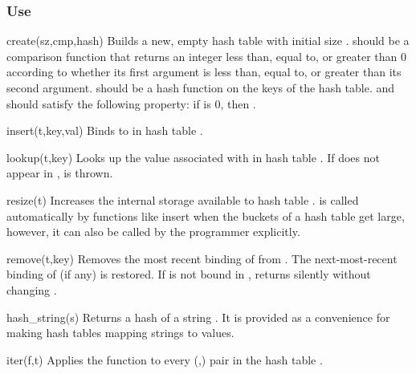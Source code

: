 \subsubsection*{Use}

\begin{defun}{create}{(sz,cmp,hash)}
Builds a new, empty hash table with initial size .  
should be a comparison function that returns an integer less than, equal
to, or greater than 0 according to whether its first argument is less
than, equal to, or greater than its second argument.   should
be a hash function on the keys of the hash table.   and
 should satisfy the following property: if
 is 0, then .
\end{defun}

\begin{defun}{insert}{(t,key,val)}
Binds  to  in hash table .
\end{defun}

\begin{defun}{lookup}{(t,key)}
Looks up the value associated with  in hash table .  If
 does not appear in ,  is thrown.
\end{defun}


\begin{defun}{resize}{(t)}
Increases the internal storage available to hash table .
 is called automatically by functions like insert when the
buckets of a hash table get large, however, it can also be called by the
programmer explicitly.
\end{defun}

\begin{defun}{remove}{(t,key)}
Removes the most recent binding of  from .  The
next-most-recent binding of  (if any) is restored.  If
 is not bound in ,  returns silently
without changing .
\end{defun}


\begin{defun}{hash_string}{(s)}
Returns a hash of a string .  It is provided as a convenience for
making hash tables mapping strings to values.
\end{defun}

\begin{defun}{iter}{(f,t)}
Applies the function  to every (,) pair in
the hash table .
\end{defun}

